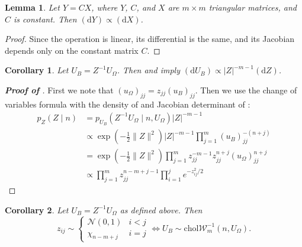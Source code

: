 \documentclass[12pt,a4paper,reqno]{amsart}
\numberwithin{equation}{section}
\newtheorem{lemma}{Lemma}[section]
\newtheorem{corollary}{Corollary}[section]
\newcommand{\cholinvwishart}[1]{\mathrm{chol}\mathcal{W}^{-1}_{#1}}
\renewcommand{\det}[1]{\left| {#1} \right|}
\newcommand{\dmeasure}[1]{\left(\dd{#1}\right)}
\newcommand{\dd}[1]{\mathrm{d}{#1}}
\begin{document}
\begin{lemma}\label{lem:trimuldetjac}
    Let $Y = C X$, where $Y$, $C$, and $X$ are $m \times m$ triangular matrices, and $C$ is constant.
    Then $\dmeasure{Y} \propto \dmeasure{X}$.
\end{lemma}
\begin{proof}
    Since the operation is linear, its differential is the same, and its Jacobian depends only on the constant matrix $C$.
\end{proof}

\begin{corollary}
    Let $U_B = Z^{-1} U_\Omega$.
    Then  and  imply $\dmeasure{U_B} \propto \det{Z}^{-m-1} \dmeasure{Z}$.
\end{corollary}

\begin{proof}[\textbf{Proof of }]
    First we note that $(u_\Omega)_{jj} = z_{jj} (u_B)_{jj}$.
    Then we use the change of variables formula with the density of  and Jacobian determinant of :
    \begin{align*}
        p_Z(Z \mid n) & = p_{U_B}(Z^{-1} U_\Omega \mid n, U_\Omega) \det{Z}^{-m-1}                                                      \\
                      & \propto \exp\left(-\frac{1}{2}\lVert Z \rVert^2\right) \det{Z}^{-m-1} \prod_{j=1}^m (u_B)_{jj}^{-(n+j)}         \\
                      & = \exp\left(-\frac{1}{2}\lVert Z \rVert^2\right) \prod_{j=1}^m z_{jj}^{-m-1} z_{jj}^{n+j} (u_\Omega)_{jj}^{n+j} \\
                      & \propto \prod_{j=1}^m z_{jj}^{n-m+j-1} \prod_{i=1}^j e^{-z_{ij}^2/2}
    \end{align*}
\end{proof}

\begin{corollary}\label{cor:invwishartbartlett}
    Let $U_B = Z^{-1} U_\Omega$ as defined above.
    Then
    \begin{equation}
        z_{ij} \sim \begin{cases}\mathcal{N}(0, 1) & i < j\\ \chi_{n-m+j} & i = j\end{cases} \iff U_B \sim \cholinvwishart{m}(n, U_\Omega).
    \end{equation}
\end{corollary}
\end{document}
